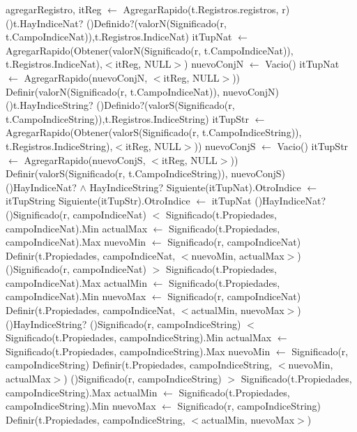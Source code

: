 \begin{Algoritmos}
  \begin{algoritmo}{agregarRegistro}{, }{}
  	itReg $\leftarrow$ AgregarRapido(t.Registros.registros, r)  
	\If(){t.HayIndiceNat?}{
    	\eIf(){Definido?(valorN(Significado(r, t.CampoIndiceNat)),t.Registros.IndiceNat)}{
			itTupNat $\gets$ AgregarRapido(Obtener(valorN(Significado(r, t.CampoIndiceNat)), t.Registros.IndiceNat),$<$itReg, NULL$>$) 
        }{
        	nuevoConjN $\leftarrow$ Vacio()  
            itTupNat $\gets$ AgregarRapido(nuevoConjN, $<$itReg, NULL$>$))  
        	Definir(valorN(Significado(r, t.CampoIndiceNat)), nuevoConjN) 
        }
    }
	\If(){t.HayIndiceString?}{
    	\eIf(){Definido?(valorS(Significado(r, t.CampoIndiceString)),t.Registros.IndiceString)}{
        	itTupStr $\gets$ AgregarRapido(Obtener(valorS(Significado(r, t.CampoIndiceString)), t.Registros.IndiceString),$<$itReg, NULL$>$)) 
        }{
        	nuevoConjS $\leftarrow$ Vacio() 
            itTupStr $\gets$ AgregarRapido(nuevoConjS, $<$itReg, NULL$>$)) 
        	Definir(valorS(Significado(r, t.CampoIndiceString)), nuevoConjS) 
        }
    }
    \If(){HayIndiceNat? $\land$ HayIndiceString?}{
    	Siguiente(itTupNat).OtroIndice $\gets$ itTupString 
        Siguiente(itTupStr).OtroIndice $\gets$ itTupNat 
    }
\If(){HayIndiceNat?}{
	\If(){Significado(r, campoIndiceNat) $<$ Significado(t.Propiedades, campoIndiceNat).Min}{
    	actualMax $\gets$ Significado(t.Propiedades, campoIndiceNat).Max 
        nuevoMin $\gets$ Significado(r, campoIndiceNat) 
		Definir(t.Propiedades, campoIndiceNat, $<$nuevoMin, actualMax$>$) 
	}
	\If(){Significado(r, campoIndiceNat) $>$ Significado(t.Propiedades, campoIndiceNat).Max}{
    	actualMin $\gets$ Significado(t.Propiedades, campoIndiceNat).Min 
        nuevoMax $\gets$ Significado(r, campoIndiceNat) 
		Definir(t.Propiedades, campoIndiceNat, $<$actualMin, nuevoMax$>$) 
	}
}
\If(){HayIndiceString?}{
	\If(){Significado(r, campoIndiceString) $<$ Significado(t.Propiedades, campoIndiceString).Min}{
    	actualMax $\gets$ Significado(t.Propiedades, campoIndiceString).Max 
        nuevoMin $\gets$ Significado(r, campoIndiceString) 
		Definir(t.Propiedades, campoIndiceString, $<$nuevoMin, actualMax$>$) 
	}
	\If(){Significado(r, campoIndiceString) $>$ Significado(t.Propiedades, campoIndiceString).Max}{
    	actualMin $\gets$ Significado(t.Propiedades, campoIndiceString).Min 
        nuevoMax $\gets$ Significado(r, campoIndiceString) 
		Definir(t.Propiedades, campoIndiceString, $<$actualMin, nuevoMax$>$) 
	}
}
    

\end{algoritmo}
\end{Algoritmos}
